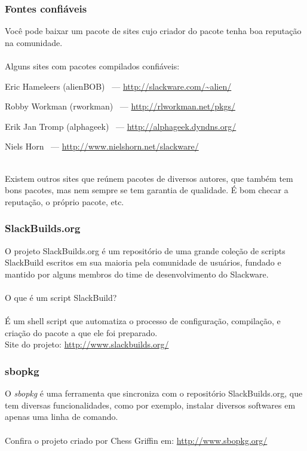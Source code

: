 \documentclass[aspectratio=169]{beamer}
\begin{document}
\begin{frame}
	\frametitle{Fontes confiáveis}
	Você pode baixar um pacote de sites cujo criador do pacote tenha boa
	reputação na comunidade.\\
	~\\
	Alguns sites com pacotes compilados confiáveis:
	~\\
	\begin{itemize}
		\tiny{
		\item Eric Hameleers (alienBOB) ~--- \url{http://slackware.com/~alien/}
		\item Robby Workman (rworkman) ~--- \url{http://rlworkman.net/pkgs/}
		\item Erik Jan Tromp (alphageek) ~--- \url{http://alphageek.dyndns.org/}
		\item Niels Horn ~--- \url{http://www.nielshorn.net/slackware/}}
	\end{itemize}
	~\\
	Existem outros sites que reúnem pacotes de diversos autores, que também tem bons
	pacotes, mas nem sempre se tem garantia de qualidade. É bom checar a reputação,
	o próprio pacote, etc.
\end{frame}

\begin{frame}
	\frametitle{SlackBuilds.org}
	O projeto SlackBuilds.org é um repositório de uma grande coleção de scripts
	SlackBuild escritos em sua maioria pela comunidade de usuários, fundado
	e mantido por alguns membros do time de desenvolvimento do Slackware.\\
	~\\
	O que é um script SlackBuild?\\
	~\\
	É um shell script que automatiza o processo de configuração, compilação,
	e criação do pacote a que ele foi preparado.
	~\\
	Site do projeto: \url{http://www.slackbuilds.org/}
\end{frame}

\begin{frame}
	\frametitle{sbopkg}
	O \textit{sbopkg} é uma ferramenta que sincroniza com o repositório
	SlackBuilds.org, que tem diversas funcionalidades, como por exemplo,
	instalar diversos softwares em apenas uma linha de comando.\\
	~\\
	Confira o projeto criado por Chess Griffin em: \url{http://www.sbopkg.org/}
\end{frame}
\end{document}
